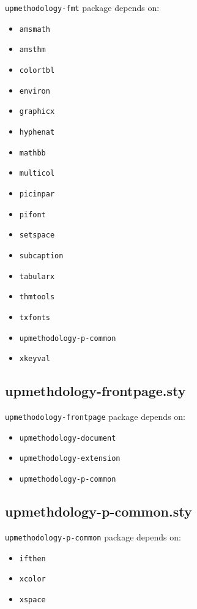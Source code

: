 \documentclass[book]{upmethodology-document}
\begin{document}
\texttt{upmethodology-fmt} package depends on:
\begin{itemize}
\item \texttt{amsmath}
\item \texttt{amsthm}
\item \texttt{colortbl}
\item \texttt{environ}
\item \texttt{graphicx}
\item \texttt{hyphenat}
\item \texttt{mathbb}
\item \texttt{multicol}
\item \texttt{picinpar}
\item \texttt{pifont}
\item \texttt{setspace}
\item \texttt{subcaption}
\item \texttt{tabularx}
\item \texttt{thmtools}
\item \texttt{txfonts}
\item \texttt{upmethodology-p-common}
\item \texttt{xkeyval}
\end{itemize}

\subsection{upmethdology-frontpage.sty}

\texttt{upmethodology-frontpage} package depends on:
\begin{itemize}
\item \texttt{upmethodology-document}
\item \texttt{upmethodology-extension}
\item \texttt{upmethodology-p-common}
\end{itemize}

\subsection{upmethdology-p-common.sty}

\texttt{upmethodology-p-common} package depends on:
\begin{itemize}
\item \texttt{ifthen}
\item \texttt{xcolor}
\item \texttt{xspace}
\end{itemize}
\end{document}

